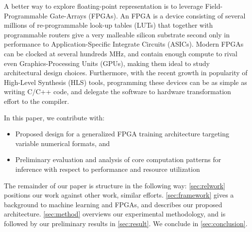 \documentclass[techrep,english]{ipsj} %
\begin{document}
{A better way to explore floating-point representation is to leverage Field-Programmable Gate-Arrays (FPGAs).
An FPGA is a device consisting of several millions of re-programmable look-up tables (LUTs) that together with programmable routers give a very malleable silicon substrate second only in performance to Application-Specific Integrate Circuits (ASICs).
Modern FPGAs can be clocked at several hundreds MHz, and contain enough compute to rival even Graphics-Processing Units (GPUs), making them ideal to study architectural design choices.
Furthermore, with the recent growth in popularity of High-Level Synthesis (HLS) tools, programming these devices can be as simple as writing C/C++ code, and delegate the software to hardware transformation effort to the compiler.

In this paper, we contribute with:
\begin{itemize}
\item Proposed design for a generalized FPGA training architecture targeting variable numerical formats, and
\item Preliminary evaluation and analysis of core computation patterns for inference with respect to performance and resource utilization
\end{itemize}

The remainder of our paper is structure in the following way: \cref{sec:relwork} positions our work against other work, similar efforts.
\cref{sec:framework} gives a background to machine learning and FPGAs, and describes our proposed architecture.
\cref{sec:method} overviews our experimental methodology, and is followed by our preliminary results in \cref{sec:result}.
We conclude in \cref{sec:conclusion}.

}
\end{document}
